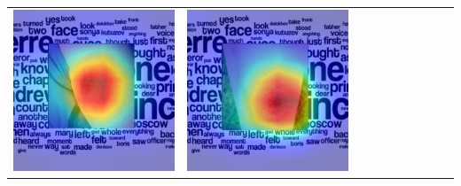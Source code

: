 \begin{landscape}
\begin{table}[]
\begin{tabular}{@{}c c c c c c c c c c@{}}
			\includegraphics[width=.12\textheight ,keepaspectratio]{images/pretraining/gradcam/3/EfficientNetB1CombinedGradCam.png} &
			\includegraphics[width=.12\textheight ,keepaspectratio]{images/pretraining/gradcam/9/EfficientNetB1CombinedGradCam.png} &

\end{tabular}
\end{table}
\end{landscape}
